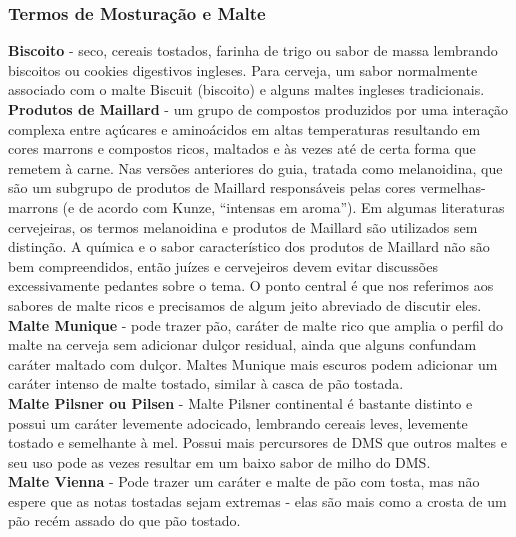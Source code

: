 \subsubsection*{Termos de Mosturação e Malte}
\textbf{Biscoito} - seco, cereais tostados, farinha de trigo ou sabor de massa lembrando biscoitos ou cookies digestivos ingleses. Para cerveja, um sabor normalmente associado com o malte Biscuit (biscoito) e alguns maltes ingleses tradicionais.\\
\textbf{Produtos de Maillard} - um grupo de compostos produzidos por uma interação complexa entre açúcares e aminoácidos em altas temperaturas resultando em cores marrons e compostos ricos, maltados e às vezes até de certa forma que remetem à carne. Nas versões anteriores do guia, tratada como melanoidina, que são um subgrupo de produtos de Maillard responsáveis pelas cores vermelhas-marrons (e de acordo com Kunze, “intensas em aroma”). Em algumas literaturas cervejeiras, os termos melanoidina e produtos de Maillard são utilizados sem distinção. A química e o sabor característico dos produtos de Maillard não são bem compreendidos, então juízes e cervejeiros devem evitar discussões excessivamente pedantes sobre o tema. O ponto central é que nos referimos aos sabores de malte ricos e precisamos de algum jeito abreviado de discutir eles.\\
\textbf{Malte Munique} - pode trazer pão, caráter de malte rico que amplia o perfil do malte na cerveja sem adicionar dulçor residual, ainda que alguns confundam caráter maltado com dulçor. Maltes Munique mais escuros podem adicionar um caráter intenso de malte tostado, similar à casca de pão tostada.\\
\textbf{Malte Pilsner ou Pilsen} - Malte Pilsner continental é bastante distinto e possui um caráter levemente adocicado, lembrando cereais leves, levemente tostado e semelhante à mel. Possui mais percursores de DMS que outros maltes e seu uso pode as vezes resultar em um baixo sabor de milho do DMS.\\
\textbf{Malte Vienna} - Pode trazer um caráter e malte de pão com tosta, mas não espere que as notas tostadas sejam extremas - elas são mais como a crosta de um pão recém assado do que pão tostado.

